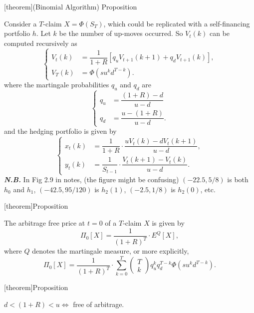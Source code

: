 \documentclass[twocolumn,landscape,10pt]{article}
\theoremstyle{definition}
\begin{document}
[theorem]{(Binomial
Algorithm) Proposition}
\begin{The binomial algorithm}
    Consider a $T$-claim $X=\Phi(S_T)$, which could be replicated with a
    self-financing portfolio $h$. Let $k$ be the number of up-moves occurred. So
    $V_t(k)$ can be computed recursively as
    \[
        \begin{cases}
            V_t(k) &=
            \dfrac{1}{1+R}\left[q_uV_{t+1}(k+1)+q_dV_{t+1}(k)\right],\\[2ex]
            V_T(k) &= \Phi(su^kd^{T-k}).
        \end{cases}
    \]
    where the martingale probabilities $q_u$ and $q_d$ are
    \[
        \begin{cases}
            q_u &= \dfrac{(1+R)-d}{u-d}\\[2ex]
            q_d &= \dfrac{u-(1+R)}{u-d}.
        \end{cases}
    \]
    and the hedging portfolio is given by
    \[
        \begin{cases}
            x_t(k) &= \dfrac{1}{1+R}\cdot \dfrac{uV_t(k)-dV_t(k+1)}{u-d},\\[2ex]
            y_t(k) &= \dfrac{1}{S_{t-1}}\cdot \dfrac{V_t(k+1)-V_t(k)}{u-d}.
        \end{cases}
    \]
    \textbf{\emph{N.B.}} 
    In Fig 2.9 in notes, (the figure might be confusing) $(-22.5,5/8)$ is both $h_0$ and $h_1$,
    $(-42.5,95/120)$ is $h_2(1)$, $(-2.5,1/8)$ is $h_2(0)$, etc.
\end{The binomial algorithm}

[theorem]{Proposition}
\begin{t claim arbitrage free price}
    The arbitrage free price at $t=0$ of a $T$-claim $X$ is given by
    \[
        \Pi_0[X]=\frac{1}{{(1+R)}^{T}}\cdot E^Q[X],
    \]
    where $Q$ denotes the martingale measure, or more explicitly,
    \[
        \Pi_0[X]=\frac{1}{{(1+R)}^{T}}\cdot\sum_{k=0}^{T}
        \begin{pmatrix}
            T \\
            k
        \end{pmatrix} 
        q_u^kq_d^{T-k}\Phi(su^kd^{T-k}).
    \]
\end{t claim arbitrage free price}

[theorem]{Proposition}
\begin{iff condition for arbitrage free}
    $d<(1+R)<u\iff$ free of arbitrage.
\end{iff condition for arbitrage free}
\end{document}
